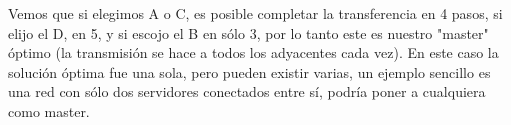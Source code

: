 Vemos que si elegimos A o C, es posible completar la transferencia en 4 pasos, si elijo el D, en 5, y si escojo el B en sólo 3, por lo tanto este es nuestro "master"   óptimo (la transmisión se hace a todos los adyacentes cada vez).
En este caso la solución óptima fue una sola, pero pueden existir varias, un ejemplo sencillo es una red con sólo dos servidores conectados entre sí, podría poner a cualquiera como master.